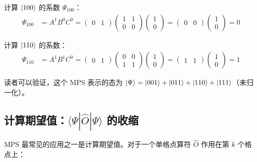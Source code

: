 \documentclass[12pt,a4paper]{ctexart}
\begin{document}
\begin{examplebox}
计算 $\ket{100}$ 的系数 $\Psi_{100}$：
\begin{align}
\Psi_{100} &= A^1 B^0 C^0
= \begin{pmatrix} 0 & 1 \end{pmatrix}
\begin{pmatrix} 1 & 1 \\ 0 & 0 \end{pmatrix}
\begin{pmatrix} 1 \\ 0 \end{pmatrix}
= \begin{pmatrix} 0 & 0 \end{pmatrix}
\begin{pmatrix} 1 \\ 0 \end{pmatrix} = 0
\end{align}

计算 $\ket{110}$ 的系数：
\begin{align}
\Psi_{110} &= A^1 B^1 C^0
= \begin{pmatrix} 0 & 1 \end{pmatrix}
\begin{pmatrix} 0 & 0 \\ 1 & 1 \end{pmatrix}
\begin{pmatrix} 1 \\ 0 \end{pmatrix}
= \begin{pmatrix} 1 & 1 \end{pmatrix}
\begin{pmatrix} 1 \\ 0 \end{pmatrix} = 1
\end{align}

读者可以验证，这个 MPS 表示的态为 $\ket{\Psi} = \ket{001} + \ket{011} + \ket{110} + \ket{111}$（未归一化）。
\end{examplebox}

\subsection{计算期望值：$\langle\Psi|\hat{O}|\Psi\rangle$ 的收缩}

MPS 最常见的应用之一是计算期望值。对于一个单格点算符 $\hat{O}$ 作用在第 $k$ 个格点上：
\end{document}
